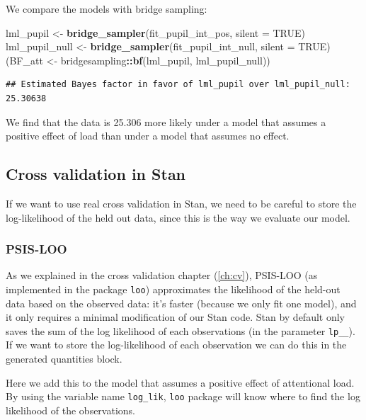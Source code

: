 \documentclass[12pt,]{krantz}
\newenvironment{Shaded}{\begin{snugshade}}{\end{snugshade}}
\newcommand{\KeywordTok}[1]{\textcolor[rgb]{0.13,0.29,0.53}{\textbf{#1}}}
\newcommand{\DataTypeTok}[1]{\textcolor[rgb]{0.13,0.29,0.53}{#1}}
\newcommand{\StringTok}[1]{\textcolor[rgb]{0.31,0.60,0.02}{#1}}
\newcommand{\OtherTok}[1]{\textcolor[rgb]{0.56,0.35,0.01}{#1}}
\newcommand{\OperatorTok}[1]{\textcolor[rgb]{0.81,0.36,0.00}{\textbf{#1}}}
\newcommand{\NormalTok}[1]{#1}
\theoremstyle{definition}
\theoremstyle{definition}
\theoremstyle{definition}
\theoremstyle{remark}
\begin{document}
We compare the models with bridge sampling:

\begin{Shaded}
\begin{Highlighting}[]
\NormalTok{lml_pupil <-}\StringTok{ }\KeywordTok{bridge_sampler}\NormalTok{(fit_pupil_int_pos, }\DataTypeTok{silent =} \OtherTok{TRUE}\NormalTok{)}
\NormalTok{lml_pupil_null <-}\StringTok{ }\KeywordTok{bridge_sampler}\NormalTok{(fit_pupil_int_null, }\DataTypeTok{silent =} \OtherTok{TRUE}\NormalTok{)}
\NormalTok{(BF_att <-}\StringTok{ }\NormalTok{bridgesampling}\OperatorTok{::}\KeywordTok{bf}\NormalTok{(lml_pupil, lml_pupil_null))}
\end{Highlighting}
\end{Shaded}

\begin{verbatim}
## Estimated Bayes factor in favor of lml_pupil over lml_pupil_null: 25.30638
\end{verbatim}

We find that the data is 25.306 more likely under a model that assumes a
positive effect of load than under a model that assumes no effect.

\subsection{Cross validation in Stan}\label{cross-validation-in-stan}

If we want to use real cross validation in Stan, we need to be careful
to store the log-likelihood of the held out data, since this is the way
we evaluate our model.

\subsubsection{PSIS-LOO}\label{psis-loo}

As we explained in the cross validation chapter (\ref{ch:cv}), PSIS-LOO
(as implemented in the package \texttt{loo}) approximates the likelihood
of the held-out data based on the observed data: it's faster (because we
only fit one model), and it only requires a minimal modification of our
Stan code. Stan by default only saves the sum of the log likelihood of
each observations (in the parameter \texttt{lp\_\_}). If we want to
store the log-likelihood of each observation we can do this in the
generated quantities block.

Here we add this to the model that assumes a positive effect of
attentional load. By using the variable name \texttt{log\_lik},
\texttt{loo} package will know where to find the log likelihood of the
observations.
\end{document}

